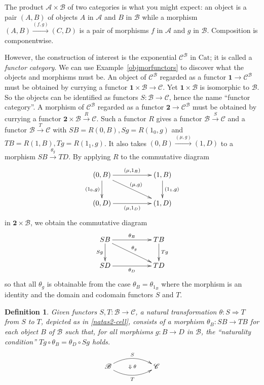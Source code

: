 \documentclass[a4paper,12pt]{article}
\newtheorem{definition}[theorem]{Definition}
\theoremstyle{step}
\newcommand{\Ra}{\Rightarrow}
\newcommand{\xra}{\xrightarrow}
\def\CA{{\mathscr A}}
\def\CB{{\mathscr B}}
\def\CC{{\mathscr C}}
\begin{document}
The product $\CA\times \CB$ of two categories is what you might expect: an object is a pair $(A,B)$ of objects $A$ in $\CA$ and $B$ in $\CB$ while a morphism
$(A,B)\xra{(f,g)}(C,D)$ is a pair of morphisms $f$ in $\CA$ and $g$ in $\CB$. 
Composition is componentwise.  

However, the construction of interest is the exponential $\CC^{\CB}$ in $\mathrm{Cat}$;
it is called a {\em functor category}. We can use Example~\ref{objmorfunctors} to discover
what the objects and morphisms must be. An object of $\CC^{\CB}$ regarded as a functor $\mathbf{1}\to \CC^{\CB}$ must be obtained by currying a functor $\mathbf{1}\times \CB\to \CC$.
Yet $\mathbf{1}\times \CB$ is isomorphic to $\CB$. So the objects can be identified as functors
$S: \CB\to \CC$, hence the name ``functor category''. A morphism of $\CC^{\CB}$ regarded as a functor $\mathbf{2}\to \CC^{\CB}$ must be obtained by currying a functor 
$\mathbf{2}\times \CB\xra{R} \CC$. Such a functor $R$ gives a functor $\CB\xra{S}\CC$ and
a functor $\CB\xra{T}\CC$ with $SB=R(0,B), Sg=R(1_0,g)$ and $TB=R(1,B), Tg=R(1_1,g)$.
It also takes $(0,B)\xra{(\mu,g)}(1,D)$ to a morphism $SB\xra{\theta_g}TD$.
By applying $R$ to the commutative diagram    
\begin{eqnarray*}
\xymatrix{
(0,B) \ar[rr]^-{(\mu,1_B)} \ar[rrd]^-{(\mu,g)} \ar[d]_-{(1_0,g)} && (1,B) \ar[d]^-{(1_1,g)} \\
(0,D) \ar[rr]_-{(\mu,1_D)} && (1,D)}
\end{eqnarray*}
in $\mathbf{2}\times \CB$, we obtain the commutative diagram
\begin{eqnarray}\label{naturalitydiag}
\begin{aligned}
\xymatrix{
SB \ar[rr]^-{\theta_B} \ar[rrd]^-{\theta_g} \ar[d]_-{Sg} && TB \ar[d]^-{Tg} \\
SD \ar[rr]_-{\theta_D} && TD}
\end{aligned}
\end{eqnarray}
so that all $\theta_g$ is obtainable from the case $\theta_B=\theta_{1_B}$ where the morphism is
an identity and the domain and codomain functors $S$ and $T$.   
\begin{definition} Given functors $S, T : \CB\to \CC$, a {\em natural transformation} $\theta : S\Ra T$
from $S$ to $T$, depicted as in \eqref{natas2-cell}, consists of a morphism $\theta_B : SB\to TB$ for each object $B$ of $\CB$ such that,
for all morphisms $g : B\to D$ in $\CB$, the ``naturality condition'' $Tg\circ \theta_B = \theta_D \circ Sg$ holds. 
\begin{eqnarray}\label{natas2-cell}
 \xymatrix{
 \CB \ar@/^1pc/[rr]^S  \ar@/_1pc/[rr]_{T}  \ar@{}[rr]|{\Downarrow \; \theta}&& \CC 
 }
\end{eqnarray}  
\end{definition}
\end{document}
